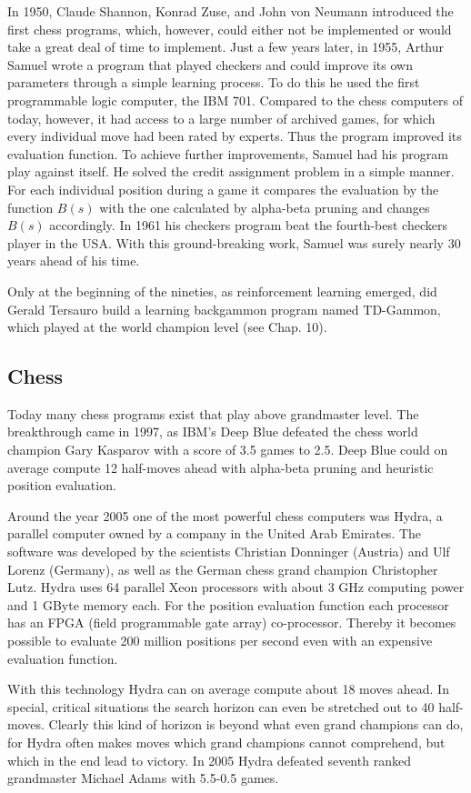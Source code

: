 \documentclass[10pt]{book}
\begin{document}
In 1950, Claude Shannon, Konrad Zuse, and John von Neumann introduced the first chess programs, which, however, could either not be implemented or would take a great deal of time to implement. Just a few years later, in 1955, Arthur Samuel wrote a program that played checkers and could improve its own parameters through a simple learning process. To do this he used the first programmable logic computer, the IBM 701. Compared to the chess computers of today, however, it had access to a large number of archived games, for which every individual move had been rated by experts. Thus the program improved its evaluation function. To achieve further improvements, Samuel had his program play against itself. He solved the credit assignment problem in a simple manner. For each individual position during a game it compares the evaluation by the function $B(s)$ with the one calculated by alpha-beta pruning and changes $B(s)$ accordingly. In 1961 his checkers program beat the fourth-best checkers player in the USA. With this ground-breaking work, Samuel was surely nearly 30 years ahead of his time.

Only at the beginning of the nineties, as reinforcement learning emerged, did Gerald Tersauro build a learning backgammon program named TD-Gammon, which played at the world champion level (see Chap. 10).

\subsection{Chess}
Today many chess programs exist that play above grandmaster level. The breakthrough came in 1997, as IBM's Deep Blue defeated the chess world champion Gary Kasparov with a score of 3.5 games to 2.5. Deep Blue could on average compute 12 half-moves ahead with alpha-beta pruning and heuristic position evaluation.

Around the year 2005 one of the most powerful chess computers was Hydra, a parallel computer owned by a company in the United Arab Emirates. The software was developed by the scientists Christian Donninger (Austria) and Ulf Lorenz (Germany), as well as the German chess grand champion Christopher Lutz. Hydra uses 64 parallel Xeon processors with about 3 GHz computing power and 1 GByte memory each. For the position evaluation function each processor has an FPGA (field programmable gate array) co-processor. Thereby it becomes possible to evaluate 200 million positions per second even with an expensive evaluation function.

With this technology Hydra can on average compute about 18 moves ahead. In special, critical situations the search horizon can even be stretched out to 40 half-moves. Clearly this kind of horizon is beyond what even grand champions can do, for Hydra often makes moves which grand champions cannot comprehend, but which in the end lead to victory. In 2005 Hydra defeated seventh ranked grandmaster Michael Adams with 5.5-0.5 games.
\end{document}
